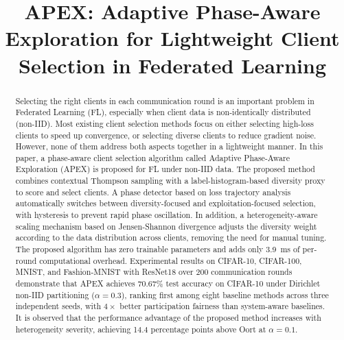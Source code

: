 \documentclass[journal]{IEEEtran}
\begin{document}
\title{APEX: Adaptive Phase-Aware Exploration for Lightweight Client Selection in Federated Learning}

\author{
}

\maketitle

\begin{abstract}
Selecting the right clients in each communication round is an important problem in Federated Learning (FL), especially when client data is non-identically distributed (non-IID). Most existing client selection methods focus on either selecting high-loss clients to speed up convergence, or selecting diverse clients to reduce gradient noise. However, none of them address both aspects together in a lightweight manner. In this paper, a phase-aware client selection algorithm called Adaptive Phase-Aware Exploration (APEX) is proposed for FL under non-IID data. The proposed method combines contextual Thompson sampling with a label-histogram-based diversity proxy to score and select clients. A phase detector based on loss trajectory analysis automatically switches between diversity-focused and exploitation-focused selection, with hysteresis to prevent rapid phase oscillation. In addition, a heterogeneity-aware scaling mechanism based on Jensen-Shannon divergence adjusts the diversity weight according to the data distribution across clients, removing the need for manual tuning. The proposed algorithm has zero trainable parameters and adds only 3.9~ms of per-round computational overhead. Experimental results on CIFAR-10, CIFAR-100, MNIST, and Fashion-MNIST with ResNet18 over 200 communication rounds demonstrate that APEX achieves 70.67\% test accuracy on CIFAR-10 under Dirichlet non-IID partitioning ($\alpha = 0.3$), ranking first among eight baseline methods across three independent seeds, with $4\times$ better participation fairness than system-aware baselines. It is observed that the performance advantage of the proposed method increases with heterogeneity severity, achieving 14.4 percentage points above Oort at $\alpha = 0.1$.
\end{abstract}
\end{document}
